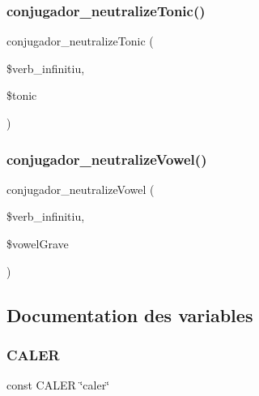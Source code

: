 \subsubsection{\texorpdfstring{conjugador\+\_\+neutralize\+Tonic()}{conjugador\_neutralizeTonic()}}
{\footnotesize\ttfamily conjugador\+\_\+neutralize\+Tonic (\begin{DoxyParamCaption}\item[{}]{\$verb\+\_\+infinitiu,  }\item[{}]{\$tonic }\end{DoxyParamCaption})}

\hypertarget{conjugador__gr3_8inc_ab7dc6b4f2a809a04cbe98e6885a895dc}{}\label{conjugador__gr3_8inc_ab7dc6b4f2a809a04cbe98e6885a895dc} 
\subsubsection{\texorpdfstring{conjugador\+\_\+neutralize\+Vowel()}{conjugador\_neutralizeVowel()}}
{\footnotesize\ttfamily conjugador\+\_\+neutralize\+Vowel (\begin{DoxyParamCaption}\item[{}]{\$verb\+\_\+infinitiu,  }\item[{}]{\$vowel\+Grave }\end{DoxyParamCaption})}



\subsection{Documentation des variables}
\hypertarget{conjugador__gr3_8inc_afb7f357610ed4add7b75ee405fc8c69c}{}\label{conjugador__gr3_8inc_afb7f357610ed4add7b75ee405fc8c69c} 
\subsubsection{\texorpdfstring{C\+A\+L\+ER}{CALER}}
{\footnotesize\ttfamily const C\+A\+L\+ER \char`\"{}caler\char`\"{}}

